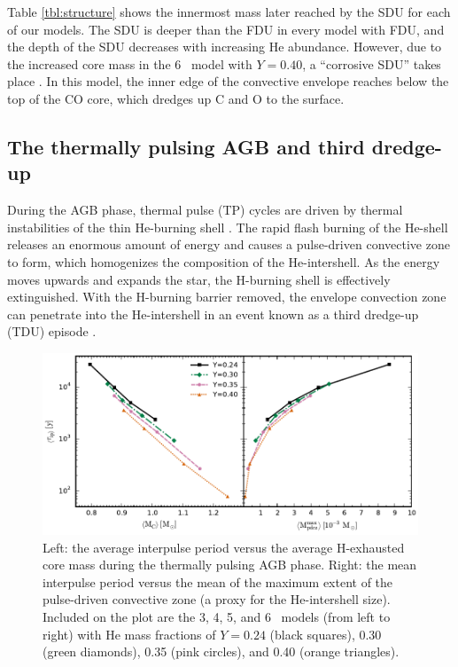 Table \ref{tbl:structure} shows the innermost mass later reached by the SDU for each of our models. The SDU is deeper than the FDU in every model with FDU, and the depth of the SDU decreases with increasing He abundance. However, due to the increased core mass in the 6 \Msun\ model with $Y=0.40$, a ``corrosive SDU'' takes place \citep{GilPons:2013ch,Doherty:2014hx}. In this model, the inner edge of the convective envelope reaches below the top of the CO core, which dredges up C and O to the surface.

\subsection{The thermally pulsing AGB and third dredge-up}\label{sec:tpagb}
During the AGB phase, thermal pulse (TP) cycles are driven by thermal instabilities of the thin He-burning shell \citep{Iben:1975js,Herwig:2005jn}. The rapid flash burning of the He-shell releases an enormous amount of energy and causes a pulse-driven convective zone to form, which homogenizes the composition of the He-intershell. As the energy moves upwards and expands the star, the H-burning shell is effectively extinguished. With the H-burning barrier removed, the envelope convection zone can penetrate into the He-intershell in an event known as a third dredge-up (TDU) episode \citep{Iben:1975js,Sackmann:1980ed}.

\begin{figure}
 \begin{center}\includegraphics[width=\textwidth]{fig-interpulse.pdf}\end{center}
 \caption{Left: the average interpulse period versus the average H-exhausted core mass during the thermally pulsing AGB phase. Right: the mean interpulse period versus the mean of the maximum extent of the pulse-driven convective zone (a proxy for the He-intershell size). Included on the plot are the 3, 4, 5, and 6 \Msun\ models (from left to right) with He mass fractions of $Y= 0.24$ (black squares), 0.30 (green diamonds), 0.35 (pink circles), and 0.40 (orange triangles).}\label{fig:interpulse}
\end{figure}

